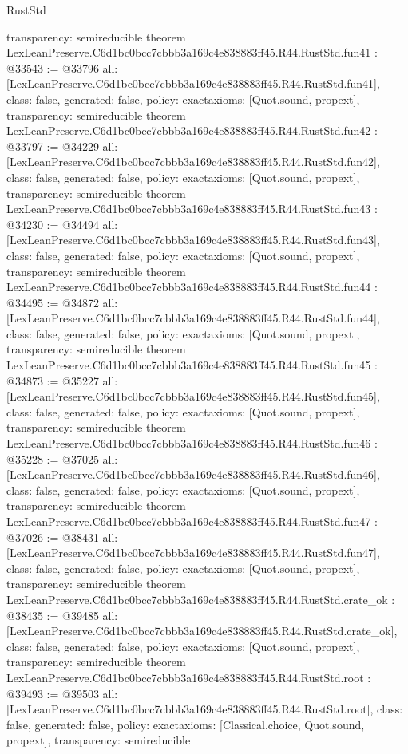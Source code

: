 \begin{lexlean}{RustStd}
\begin{coremodule}
{  transparency: semireducible
}
theorem LexLeanPreserve.C6d1bc0bcc7cbbb3a169c4e838883ff45.R44.RustStd.fun41 : @33543 := @33796 {
  all: [LexLeanPreserve.C6d1bc0bcc7cbbb3a169c4e838883ff45.R44.RustStd.fun41],
  class: false,
  generated: false,
  policy: exact{axioms: [Quot.sound, propext]},
  transparency: semireducible
}
theorem LexLeanPreserve.C6d1bc0bcc7cbbb3a169c4e838883ff45.R44.RustStd.fun42 : @33797 := @34229 {
  all: [LexLeanPreserve.C6d1bc0bcc7cbbb3a169c4e838883ff45.R44.RustStd.fun42],
  class: false,
  generated: false,
  policy: exact{axioms: [Quot.sound, propext]},
  transparency: semireducible
}
theorem LexLeanPreserve.C6d1bc0bcc7cbbb3a169c4e838883ff45.R44.RustStd.fun43 : @34230 := @34494 {
  all: [LexLeanPreserve.C6d1bc0bcc7cbbb3a169c4e838883ff45.R44.RustStd.fun43],
  class: false,
  generated: false,
  policy: exact{axioms: [Quot.sound, propext]},
  transparency: semireducible
}
theorem LexLeanPreserve.C6d1bc0bcc7cbbb3a169c4e838883ff45.R44.RustStd.fun44 : @34495 := @34872 {
  all: [LexLeanPreserve.C6d1bc0bcc7cbbb3a169c4e838883ff45.R44.RustStd.fun44],
  class: false,
  generated: false,
  policy: exact{axioms: [Quot.sound, propext]},
  transparency: semireducible
}
theorem LexLeanPreserve.C6d1bc0bcc7cbbb3a169c4e838883ff45.R44.RustStd.fun45 : @34873 := @35227 {
  all: [LexLeanPreserve.C6d1bc0bcc7cbbb3a169c4e838883ff45.R44.RustStd.fun45],
  class: false,
  generated: false,
  policy: exact{axioms: [Quot.sound, propext]},
  transparency: semireducible
}
theorem LexLeanPreserve.C6d1bc0bcc7cbbb3a169c4e838883ff45.R44.RustStd.fun46 : @35228 := @37025 {
  all: [LexLeanPreserve.C6d1bc0bcc7cbbb3a169c4e838883ff45.R44.RustStd.fun46],
  class: false,
  generated: false,
  policy: exact{axioms: [Quot.sound, propext]},
  transparency: semireducible
}
theorem LexLeanPreserve.C6d1bc0bcc7cbbb3a169c4e838883ff45.R44.RustStd.fun47 : @37026 := @38431 {
  all: [LexLeanPreserve.C6d1bc0bcc7cbbb3a169c4e838883ff45.R44.RustStd.fun47],
  class: false,
  generated: false,
  policy: exact{axioms: [Quot.sound, propext]},
  transparency: semireducible
}
theorem LexLeanPreserve.C6d1bc0bcc7cbbb3a169c4e838883ff45.R44.RustStd.crate_ok : @38435 := @39485 {
  all: [LexLeanPreserve.C6d1bc0bcc7cbbb3a169c4e838883ff45.R44.RustStd.crate_ok],
  class: false,
  generated: false,
  policy: exact{axioms: [Quot.sound, propext]},
  transparency: semireducible
}
theorem LexLeanPreserve.C6d1bc0bcc7cbbb3a169c4e838883ff45.R44.RustStd.root : @39493 := @39503 {
  all: [LexLeanPreserve.C6d1bc0bcc7cbbb3a169c4e838883ff45.R44.RustStd.root],
  class: false,
  generated: false,
  policy: exact{axioms: [Classical.choice, Quot.sound, propext]},
  transparency: semireducible
}


\end{coremodule}
\end{lexlean}
